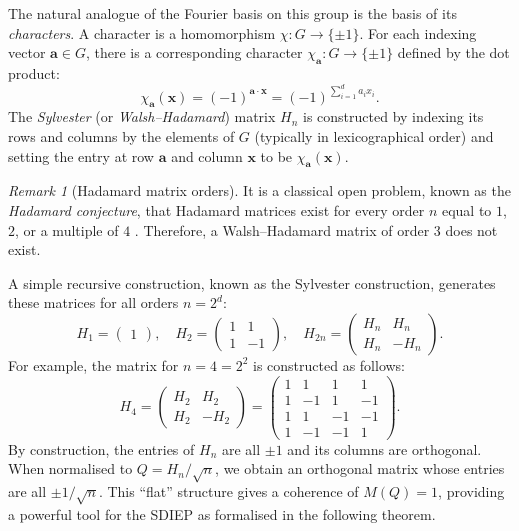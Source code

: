 \documentclass[12pt,fleqn]{amsart}
\theoremstyle{remark}
\newtheorem{rem}[thm]{Remark}
\newcommand{\1}{\mathbf{1}}
\begin{document}
The natural analogue of the Fourier basis on this group is the basis of its \emph{characters}. A character is a homomorphism $\chi\colon G \to \{\pm 1\}$. For each indexing vector $\mathbf{a} \in G$, there is a corresponding character $\chi_{\mathbf{a}}: G \to \{\pm 1\}$ defined by the dot product:
\[
\chi_{\mathbf{a}}(\mathbf{x}) = (-1)^{\mathbf{a}\cdot\mathbf{x}} = (-1)^{\sum_{i=1}^d a_i x_i}.
\]
The \emph{Sylvester} (or \emph{Walsh--Hadamard}) matrix $H_n$ is constructed by indexing its rows and columns by the elements of $G$ (typically in lexicographical order) and setting the entry at row $\mathbf{a}$ and column $\mathbf{x}$ to be $\chi_{\mathbf{a}}(\mathbf{x})$.
\

\begin{rem}[Hadamard matrix orders]
It is a classical open problem, known as the \emph{Hadamard conjecture}, that Hadamard matrices exist for every order $n$ equal to $1$, $2$, or a multiple of $4$ \cite{HedayatWallis}. Therefore, a Walsh--Hadamard matrix of order $3$ does not exist.
\end{rem}

A simple recursive construction, known as the Sylvester construction, generates these matrices for all orders $n=2^d$:
\[
H_1 = \begin{pmatrix} 1 \end{pmatrix}, \quad H_2 = \begin{pmatrix} 1 & 1 \\ 1 & -1 \end{pmatrix}, \quad H_{2n} = \begin{pmatrix} H_n & H_n \\ H_n & -H_n \end{pmatrix}.
\]
For example, the matrix for $n=4=2^2$ is constructed as follows:
\[
H_4 = \begin{pmatrix} H_2 & H_2 \\ H_2 & -H_2 \end{pmatrix} = 
\left(\begin{array}{cc|cc}
1 & 1 & 1 & 1 \\
1 & -1 & 1 & -1 \\\hline
1 & 1 & -1 & -1 \\
1 & -1 & -1 & 1
\end{array}\right).
\]
By construction, the entries of $H_n$ are all $\pm 1$ and its columns are orthogonal. When normalised to $Q = H_n/\sqrt{n}$, we obtain an orthogonal matrix whose entries are all $\pm 1/\sqrt{n}$. This ``flat'' structure gives a coherence of $M(Q)=1$, providing a powerful tool for the SDIEP as formalised in the following theorem.
\end{document}
